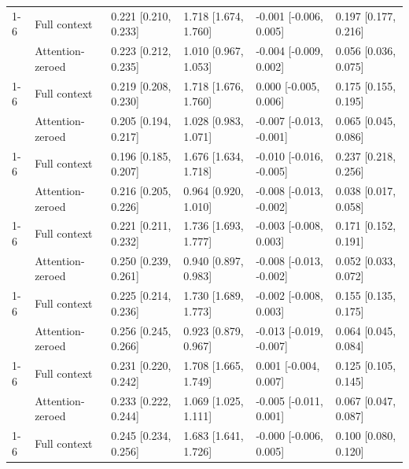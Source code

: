 \documentclass[11pt]{article}
\begin{document}
\begin{longtable}[t]{llllll}
\cmidrule{1-6}\pagebreak[0]
 & Full context & 0.221 [0.210, 0.233] & 1.718 [1.674, 1.760] & -0.001 [-0.006, 0.005] & 0.197 [0.177, 0.216]\\
\nopagebreak
\multirow{-2}{*}{\raggedright\arraybackslash GPT-2-L} & Attention-zeroed & 0.223 [0.212, 0.235] & 1.010 [0.967, 1.053] & -0.004 [-0.009, 0.002] & 0.056 [0.036, 0.075]\\
\cmidrule{1-6}\pagebreak[0]
 & Full context & 0.219 [0.208, 0.230] & 1.718 [1.676, 1.760] & 0.000 [-0.005, 0.006] & 0.175 [0.155, 0.195]\\
\nopagebreak
\multirow{-2}{*}{\raggedright\arraybackslash GPT-2-XL} & Attention-zeroed & 0.205 [0.194, 0.217] & 1.028 [0.983, 1.071] & -0.007 [-0.013, -0.001] & 0.065 [0.045, 0.086]\\
\cmidrule{1-6}\pagebreak[0]
 & Full context & 0.196 [0.185, 0.207] & 1.676 [1.634, 1.718] & -0.010 [-0.016, -0.005] & 0.237 [0.218, 0.256]\\
\nopagebreak
\multirow{-2}{*}{\raggedright\arraybackslash Pythia-160M} & Attention-zeroed & 0.216 [0.205, 0.226] & 0.964 [0.920, 1.010] & -0.008 [-0.013, -0.002] & 0.038 [0.017, 0.058]\\
\cmidrule{1-6}\pagebreak[0]
 & Full context & 0.221 [0.211, 0.232] & 1.736 [1.693, 1.777] & -0.003 [-0.008, 0.003] & 0.171 [0.152, 0.191]\\
\nopagebreak
\multirow{-2}{*}{\raggedright\arraybackslash Pythia-410M} & Attention-zeroed & 0.250 [0.239, 0.261] & 0.940 [0.897, 0.983] & -0.008 [-0.013, -0.002] & 0.052 [0.033, 0.072]\\
\cmidrule{1-6}\pagebreak[0]
 & Full context & 0.225 [0.214, 0.236] & 1.730 [1.689, 1.773] & -0.002 [-0.008, 0.003] & 0.155 [0.135, 0.175]\\
\nopagebreak
\multirow{-2}{*}{\raggedright\arraybackslash Pythia-1B} & Attention-zeroed & 0.256 [0.245, 0.266] & 0.923 [0.879, 0.967] & -0.013 [-0.019, -0.007] & 0.064 [0.045, 0.084]\\
\cmidrule{1-6}\pagebreak[0]
 & Full context & 0.231 [0.220, 0.242] & 1.708 [1.665, 1.749] & 0.001 [-0.004, 0.007] & 0.125 [0.105, 0.145]\\
\nopagebreak
\multirow{-2}{*}{\raggedright\arraybackslash OLMo-1B} & Attention-zeroed & 0.233 [0.222, 0.244] & 1.069 [1.025, 1.111] & -0.005 [-0.011, 0.001] & 0.067 [0.047, 0.087]\\
\cmidrule{1-6}\pagebreak[0]
 & Full context & 0.245 [0.234, 0.256] & 1.683 [1.641, 1.726] & -0.000 [-0.006, 0.005] & 0.100 [0.080, 0.120]\\

\end{longtable}
\end{document}
